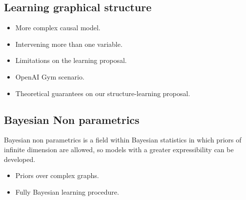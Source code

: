 \documentclass[english,letterpaper,12pt,final]{article}
\theoremstyle{definition}
\begin{document}
\subsection{Learning graphical structure}
\begin{itemize}
\item More complex causal model.
\item Intervening more than one variable.
\item Limitations on the learning proposal.
\item OpenAI Gym scenario.
\item Theoretical guarantees on our structure-learning proposal.
\end{itemize} 

\subsection{Bayesian Non parametrics}
Bayesian non parametrics is a field within Bayesian statistics in which priors of infinite dimension are allowed, so models with a greater expressibility can be developed.
\begin{itemize}
\item Priors over complex graphs.
\item Fully Bayesian learning procedure.
\end{itemize}
\end{document}
